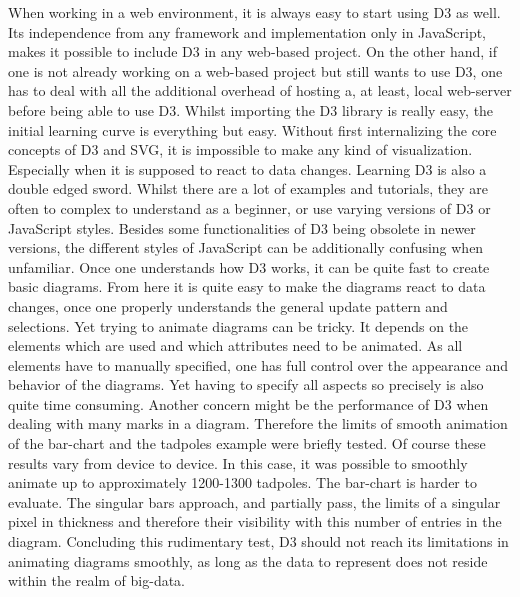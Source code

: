 When working in a web environment, it is always easy to start using D3 as well. Its independence from any framework and implementation only in JavaScript, makes it possible to include D3 in any web-based project. On the other hand, if one is not already working on a web-based project but still wants to use D3, one has to deal with all the additional overhead of hosting a, at least, local web-server before being able to use D3. Whilst importing the D3 library is really easy, the initial learning curve is everything but easy. Without first internalizing the core concepts of D3 and SVG, it is impossible to make any kind of visualization. Especially when it is supposed to react to data changes. Learning D3 is also a double edged sword. Whilst there are a lot of examples and tutorials, they are often to complex to understand as a beginner, or use varying versions of D3 or JavaScript styles. Besides some functionalities of D3 being obsolete in newer versions, the different styles of JavaScript can be additionally confusing when unfamiliar. Once one understands how D3 works, it can be quite fast to create basic diagrams. From here it is quite easy to make the diagrams react to data changes, once one properly understands the general update pattern and selections. Yet trying to animate diagrams can be tricky. It depends on the elements which are used and which attributes need to be animated. As all elements have to manually specified, one has full control over the appearance and behavior of the diagrams. Yet having to specify all aspects so precisely is also quite time consuming. Another concern might be the performance of D3 when dealing with many marks in a diagram. Therefore the limits of smooth animation of the bar-chart and the tadpoles example\cite{bostock_2020} were briefly tested. Of course these results vary from device to device. In this case, it was possible to smoothly animate up to approximately 1200-1300 tadpoles. The bar-chart is harder to evaluate. The singular bars approach, and partially pass, the limits of a singular pixel in thickness and therefore their visibility with this number of entries in the diagram. Concluding this rudimentary test, D3 should not reach its limitations in animating diagrams smoothly, as long as the data to represent does not reside within the realm of big-data.

